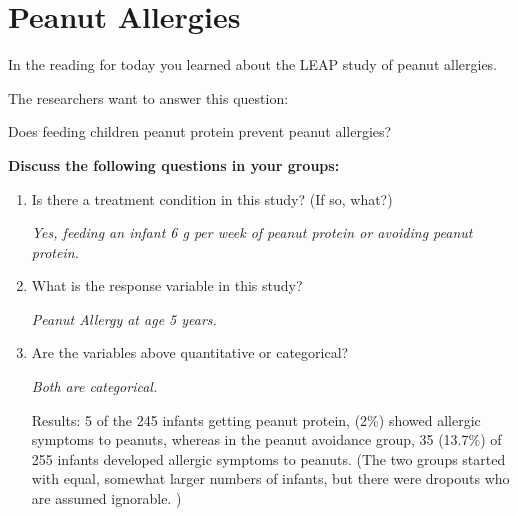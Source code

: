 \def\theTopic{Peanut Allergies}
\def\dayNum{12 }

\section{ Peanut Allergies}


In the reading for today you learned about the LEAP study of peanut
allergies. 

The researchers want to answer this question:
\begin{center}
  {\large\sf  Does feeding children peanut protein prevent peanut allergies?} 
\end{center}
{\bf
Discuss the following questions	in your groups:}
\begin{enumerate}
  \item  Is there a treatment condition in this study? (If so, what?)
\begin{students}
\vspace{2cm}
\end{students}

\begin{key}
  {\it Yes, feeding an infant 6 g per week of peanut protein or avoiding
    peanut protein. }
\end{key}


  \item  What is the response variable in this study?
\begin{students}
\vspace{2cm}
\end{students}

\begin{key}
  {\it  Peanut Allergy at age 5 years. }
\end{key}

  \item  Are the variables above quantitative or categorical?
\begin{students}
\vspace{2cm}
\end{students}

\begin{key}
  {\it  Both are categorical. }
\end{key}


Results: 5 of the 245 infants getting peanut protein,  (2\%)  showed
allergic symptoms to peanuts, whereas in the peanut
avoidance group, 35 (13.7\%) of 255 infants developed allergic
symptoms to peanuts. (The two groups started with equal, somewhat
larger numbers of infants, but there were dropouts who are assumed
ignorable. )



\end{enumerate}
